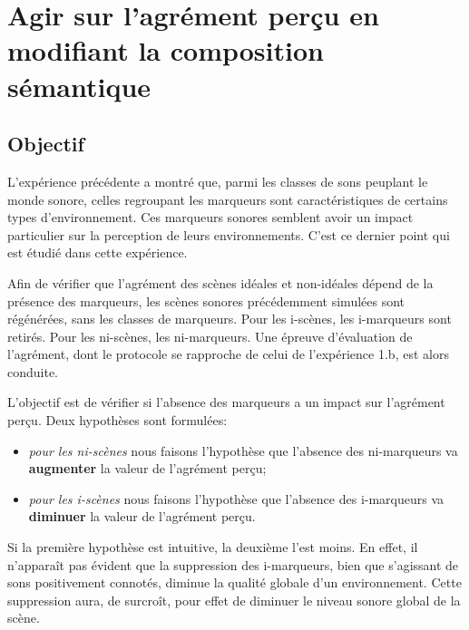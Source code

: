 
\section[Modification de la composition sémantique]{Agir sur l'agrément perçu en modifiant la composition sémantique}
\label{sec:xp3}

\subsection{Objectif}

L'expérience précédente a montré que, parmi les classes de sons peuplant le monde sonore, celles regroupant les marqueurs sont caractéristiques de certains types d'environnement. Ces marqueurs sonores semblent avoir un impact particulier sur la perception de leurs environnements. C'est ce dernier point qui est étudié dans cette expérience.

Afin de vérifier que l'agrément des scènes idéales et non-idéales dépend de la présence des marqueurs, les scènes sonores précédemment simulées sont régénérées, sans les classes de marqueurs. Pour les i-scènes, les i-marqueurs sont retirés. Pour les ni-scènes, les ni-marqueurs. Une épreuve d'évaluation de l'agrément, dont le protocole se rapproche de celui de l'expérience 1.b, est alors conduite.

L'objectif est de vérifier si l'absence des marqueurs a un impact sur l'agrément perçu. Deux hypothèses sont formulées:

\begin{itemize}
\item \emph{pour les ni-scènes} nous faisons l'hypothèse que l'absence des ni-marqueurs va \textbf{augmenter} la valeur de l'agrément perçu;
\item \emph{pour les i-scènes} nous faisons l'hypothèse que l'absence des i-marqueurs va \textbf{diminuer} la valeur de l'agrément perçu.
\end{itemize}

Si la première hypothèse est intuitive, la deuxième l'est moins. En effet, il n’apparaît pas évident que la suppression des i-marqueurs, bien que s'agissant de sons positivement connotés, diminue la qualité globale d'un environnement. Cette suppression aura, de surcroît, pour effet de diminuer le niveau sonore global de la scène. 

